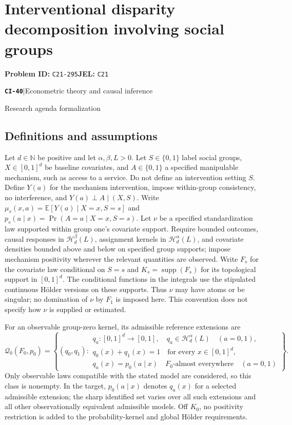 \documentclass[11pt,a4paper]{article}
\newcommand{\E}{\mathbb E}
\newcommand{\N}{\mathbb N}
\newcommand{\supp}{\operatorname{supp}}
\newcommand{\entrymeta}[3]{{\sffamily\small\color{muted}\textbf{\texttt{#1}}\quad|\quad #2\par #3\par}}
\begin{document}
\section*{Interventional disparity decomposition involving social groups}
\textbf{Problem ID:} \texttt{C21-295}\quad \textbf{JEL:} \texttt{C21}\par
\label{problem:OP-0519}
\label{beyond:CI-40}
\entrymeta{CI-40}{Econometric theory and causal inference}{Research agenda formalization}
\subsection*{Definitions and assumptions}
Let $d\in\N$ be positive and let $\alpha,\beta,L>0$. Let $S\in\{0,1\}$ label social groups, $X\in[0,1]^d$ be baseline covariates, and $A\in\{0,1\}$ a specified manipulable mechanism, such as access to a service. Do not define an intervention setting $S$. Define $Y(a)$ for the mechanism intervention, impose within-group consistency, no interference, and $Y(a)\perp A\mid(X,S)$. Write $\mu_s(x,a)=\E[Y(a)\mid X=x,S=s]$ and $p_s(a\mid x)=\Pr(A=a\mid X=x,S=s)$. Let $\nu$ be a specified standardization law supported within group one's covariate support. Require bounded outcomes, causal responses in $\mathcal H_d^\beta(L)$, assignment kernels in $\mathcal H_d^\alpha(L)$, and covariate densities bounded above and below on specified group supports; impose mechanism positivity wherever the relevant quantities are observed.
Write $F_s$ for the covariate law conditional on $S=s$ and $K_s=\supp(F_s)$ for its topological support in $[0,1]^d$. The conditional functions in the integrals use the stipulated continuous H\"older versions on these supports. Thus $\nu$ may have atoms or be singular; no domination of $\nu$ by $F_1$ is imposed here. This convention does not specify how $\nu$ is supplied or estimated.

For an observable group-zero kernel, its admissible reference extensions are
\[
 \mathcal Q_0(F_0,p_0)=\left\{(q_0,q_1):
 \begin{array}{l}
 q_a:[0,1]^d\to[0,1],\quad q_a\in\mathcal H_d^\alpha(L)\quad(a=0,1),\\
 q_0(x)+q_1(x)=1\quad\text{for every }x\in[0,1]^d,\\
 q_a(x)=p_0(a\mid x)\quad F_0\text{-almost everywhere}\quad(a=0,1)
 \end{array}\right\}.
\]
Only observable laws compatible with the stated model are considered, so this class is nonempty. In the target, $p_0(a\mid x)$ denotes $q_a(x)$ for a selected admissible extension; the sharp identified set varies over all such extensions and all other observationally equivalent admissible models. Off $K_0$, no positivity restriction is added to the probability-kernel and global H\"older requirements.
\end{document}
